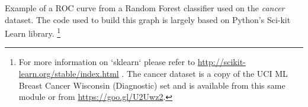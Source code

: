 Example of a ROC curve from a Random Forest classifier used on the \textit{cancer} dataset.  The code used to build this graph is largely based on Python's Sci-kit Learn library. \footnote{For more information on `sklearn` please refer to \url{http://scikit-learn.org/stable/index.html} \cite{sci-kit} . The cancer dataset is a copy of the UCI ML Breast Cancer Wisconsin (Diagnostic) set and is available from this same module or from \url{https://goo.gl/U2Uwz2}.}